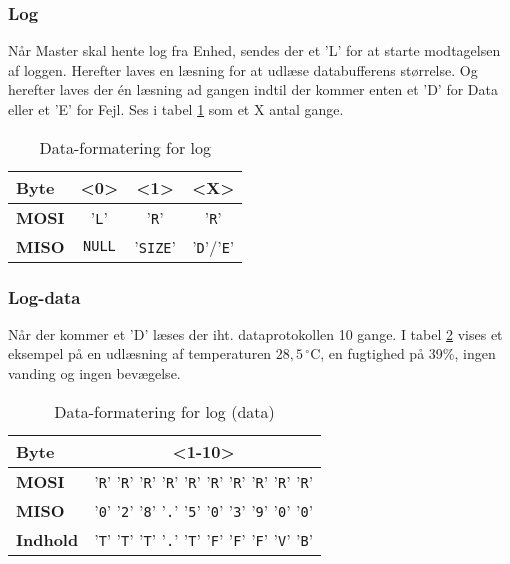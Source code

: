 \subsubsection{Log}

Når Master skal hente log fra Enhed, sendes der et 'L' for at starte modtagelsen af loggen. Herefter laves en læsning for at udlæse databufferens størrelse. Og herefter laves der én læsning ad gangen indtil der kommer enten et 'D' for Data eller et 'E' for Fejl. Ses i tabel \ref{table:SWProtokol-log} som et X antal gange.

\begin{table}[H]
	\caption{Data-formatering for log}
	\centering
	\begin{tabular}{|l|c|c|c|}
		\hline 
		\textbf{Byte} & \textbf{<0>} & \textbf{<1>} & \textbf{<X>}  \\ 
		\hline 
		\textbf{MOSI} & '\verb+L+' & '\verb+R+' & '\verb+R+' \\ 
		\hline 
		\textbf{MISO} & \verb+NULL+ & '\verb+SIZE+' & '\verb+D+'/'\verb+E+' \\ 
		\hline 
	\end{tabular} 
	\label{table:SWProtokol-log}
\end{table}

\subsubsection*{Log-data}

Når der kommer et 'D' læses der iht. dataprotokollen 10 gange. I tabel \ref{table:SWProtokol-logdata} vises et eksempel på en udlæsning af temperaturen $28,5\,^{\circ}\mathrm{C}$, en fugtighed på 39\%, ingen vanding og ingen bevægelse.

\begin{table}[H]
	\caption{Data-formatering for log (data)}
	\centering
	\begin{tabular}{|l|c|}
		\hline 
		\textbf{Byte} & \textbf{<1-10>}  \\ 
		\hline 
		\textbf{MOSI}  & '\verb+R+' '\verb+R+' '\verb+R+' '\verb+R+' '\verb+R+' '\verb+R+' '\verb+R+' '\verb+R+' '\verb+R+' '\verb+R+'  \\ 
		\hline 
		\textbf{MISO} & '\verb+0+' '\verb+2+' '\verb+8+' '\verb+.+' '\verb+5+' '\verb+0+' '\verb+3+' '\verb+9+' '\verb+0+' '\verb+0+'  \\ 
		\hline 
		\textbf{Indhold} & '\verb+T+' '\verb+T+' '\verb+T+' '\verb+.+' '\verb+T+' '\verb+F+' '\verb+F+' '\verb+F+' '\verb+V+' '\verb+B+'  \\ 
		\hline 
	\end{tabular} 
	\label{table:SWProtokol-logdata}
\end{table}

